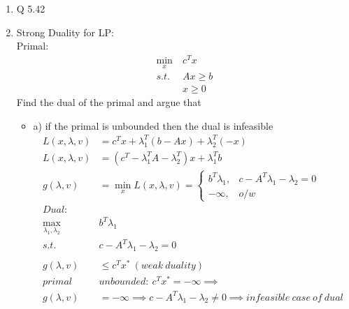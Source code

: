 \documentclass[12pt,letter]{article}
\begin{document}
\begin{enumerate}
  Relaxation of ith constraint by $\alpha$ percent:\\
  $\partial p^*(u_i,0) &= -\lambda_i^*\partial u_i$\\
  $\partial u_i = \alpha \implies$ objective function of log transformed problem experiences a decrease in value by $\lambda_i \alpha$\\
  Converting back to the original variable through identity $x=e^{y}$\\
  $z$ small $\implies e^{z} \approx 1+ z$ via Taylor expansion\\
  $e^{-\lambda_i^* \alpha} \approx 1 - \lambda_i^* \alpha \implies$ objective function experiences an improvement of $\lambda_i^* \alpha$ percent since it is a minimization problem.\\
  \pagebreak
\item Q 5.42 \\
  \pagebreak
\item Strong Duality for LP:\\
  Primal:
  \begin{align*}
    \min_x\ & c^Tx\\
    s.t.\ & Ax \geq b\\
           & x \geq 0
  \end{align*}
  Find the dual of the primal and argue that
  \begin{itemize}
  \item a) if the primal is unbounded then the dual is infeasible
    \begin{align*}
      L(x,\lambda,v) &= c^Tx + \lambda_1^T(b-Ax) + \lambda_2^T(-x)\\
      L(x,\lambda,v) &= (c^T-\lambda_1^TA -\lambda_2^T)x + \lambda_1^Tb\\
      g(\lambda,v) &= \min_x L(x,\lambda,v) =
      \begin{cases}
        b^T\lambda_1, & c -A^T\lambda_1-\lambda_2 = 0\\
        -\infty, & o/w
      \end{cases}\\
      Dual:\\
      \max_{\lambda_1,\lambda_2}\ & b^T\lambda_1\\
      s.t.\ & c - A^T\lambda_1 - \lambda_2 = 0\\
      \\
      g(\lambda,v) &\leq c^Tx^*\ (weak\ duality)\\
      primal\ & unbounded:\ c^Tx^*= -\infty \implies\\
      g(\lambda,v) &= -\infty \implies c -A^T\lambda_1-\lambda_2 \neq 0 \implies infeasible\ case\ of\ dual

\end{align*}
\end{itemize}
\end{enumerate}
\end{document}
